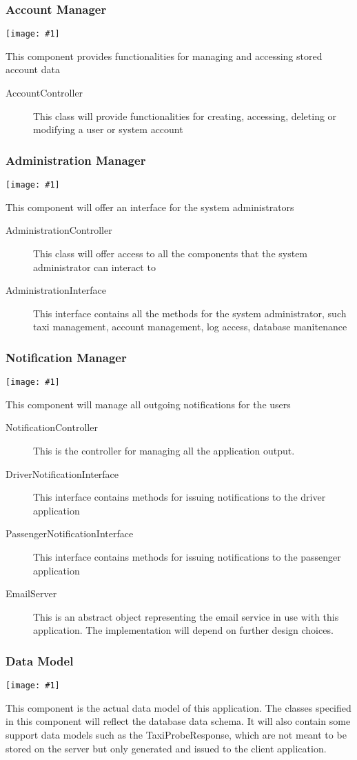 \documentclass[11pt, a4paper,titlepage]{article}
\newcommand{\image}[1]{
	\begin{center}
		\noindent \texttt{[image: \#1]}
	\end{center}
	}
\begin{document}
 \subsubsection{Account Manager}
	 \image{diagram_class_account.png}
	 This component provides functionalities for managing and accessing stored account data
	 \begin{description}
		\item[AccountController] This class will provide functionalities for creating, accessing, deleting or modifying a user or system account
	 \end{description}
	 \newpage
 \subsubsection{Administration Manager}
	 \image{diagram_class_administration.png}
	 This component will offer an interface for the system administrators
	 \begin{description}
	 	\item[AdministrationController] This class will offer access to all the components that the system administrator can interact to
	 	\item[AdministrationInterface] This interface contains all the methods for the system administrator, such taxi management, account management, log access, database manitenance
	 \end{description}
	 \newpage
 \subsubsection{Notification Manager}
	 \image{diagram_class_notification.png}
	 This component will manage all outgoing notifications for the users
	 \begin{description}
	 	\item[NotificationController] This is the controller for managing all the application output.
	 	\item[DriverNotificationInterface] This interface contains methods for issuing notifications to the driver application
	 	\item[PassengerNotificationInterface] This interface contains methods for issuing notifications to the passenger application
	 	\item[EmailServer] This is an abstract object representing the email service in use with this application. The implementation will depend on further design choices.
	 \end{description}
	 \newpage
 \subsubsection{Data Model}
	 \image{diagram_class_datamodel.png}
	 This component is the actual data model of this application. The classes specified in this component will reflect the database data schema. It will also contain some support data models such as the TaxiProbeResponse, which are not meant to be stored on the server but only generated and issued to the client application.
	 \newpage
\end{document}
